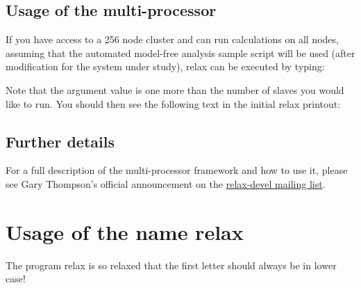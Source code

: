 
\subsection{Usage of the multi-processor}

If you have access to a 256 node cluster and can run calculations on all nodes, assuming that the  automated model-free analysis sample script will be used (after modification for the system under study), relax can be executed by typing:


Note that the argument  value is one more than the number of slaves you would like to run.
You should then see the following text in the initial relax printout:





\subsection{Further details}

For a full description of the multi-processor framework and how to use it, please see Gary Thompson's official announcement on the \href{https://mail.gna.org/public/relax-devel/2007-05/msg00000.html}{relax-devel mailing list}.




\section{Usage of the name relax}

The program relax is so relaxed that the first letter should always be in lower case!

